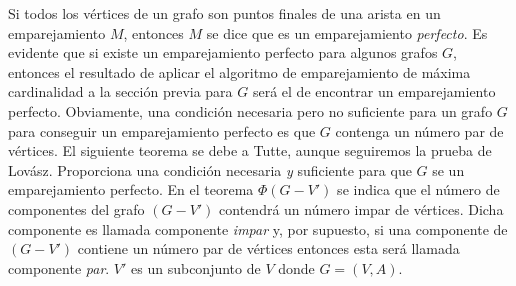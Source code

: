 \documentclass[10pt,a5paper]{book}
\begin{document}
Si todos los vértices de un grafo son puntos finales de una arista en un emparejamiento $M$, entonces $M$ se dice que es un emparejamiento \emph{perfecto}. Es evidente que si existe un emparejamiento perfecto para algunos grafos $G$, entonces el resultado de aplicar el algoritmo de emparejamiento de máxima cardinalidad a la sección previa para $G$ será el de encontrar un emparejamiento perfecto. Obviamente, una condición necesaria pero no suficiente para un grafo $G$ para conseguir un emparejamiento perfecto es que $G$ contenga un número par de vértices. El siguiente teorema se debe a Tutte\cite{n}, aunque seguiremos la prueba de Lovász\cite{o}. Proporciona una condición necesaria \emph{y} suficiente para que $G$ se un emparejamiento perfecto. En el teorema $\Phi(G - V')$ se indica que el número de componentes del grafo $(G - V')$ contendrá un número impar de vértices. Dicha componente es llamada componente \emph{impar} y, por supuesto, si una componente de $(G - V')$ contiene un número par de vértices entonces esta será llamada componente \emph{par}. $V'$ es un subconjunto de $V$ donde $G = (V, A)$.
\end{document}
